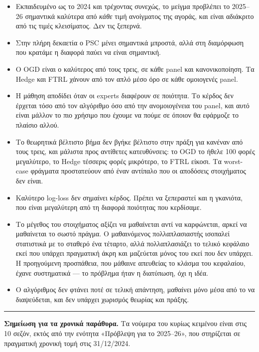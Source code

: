 \documentclass[11pt,a4paper]{article}
\renewcommand{\_}{\oldunderscore\allowbreak}
\begin{document}
\begin{itemize}
  \item Εκπαιδευμένο ως το 2024 και τρέχοντας συνεχώς, το μείγμα προβλέπει το 2025--26
        σημαντικά καλύτερα από \emph{κάθε} τιμή ανοίγματος της αγοράς, και είναι αδιάκριτο
        από τις τιμές κλεισίματος. Δεν τις ξεπερνά.
  \item Στην πλήρη δεκαετία ο PSC μένει σημαντικά μπροστά, αλλά στη διαμόρφωση που κρατάμε
        η διαφορά παύει να είναι σημαντική.
  \item Ο OGD είναι ο καλύτερος από τους τρεις, σε κάθε panel και κανονικοποίηση. Τα Hedge
        και FTRL χάνουν από τον απλό μέσο όρο σε κάθε ομοιογενές panel.
  \item Η μάθηση αποδίδει όταν οι experts διαφέρουν σε ποιότητα. Το κέρδος δεν έρχεται τόσο
        από τον αλγόριθμο όσο από την ανομοιογένεια του panel, και αυτό είναι μάλλον το πιο
        χρήσιμο που έχουμε να πούμε σε όποιον θα εφάρμοζε το πλαίσιο αλλού.
  \item Το θεωρητικά βέλτιστο βήμα δεν βγήκε βέλτιστο στην πράξη για κανέναν από τους τρεις,
        και μάλιστα προς αντίθετες κατευθύνσεις: το OGD το ήθελε 100 φορές μεγαλύτερο, το
        Hedge τέσσερις φορές μικρότερο, το FTRL είκοσι. Τα worst-case φράγματα προστατεύουν
        από έναν αντίπαλο που οι αποδόσεις στοιχήματος δεν είναι.
  \item Καλύτερο log-loss δεν σημαίνει κέρδος. Πρέπει να ξεπεραστεί και η γκανιότα, που
        είναι μεγαλύτερη από τη διαφορά ποιότητας που κερδίσαμε.
  \item Το μέγεθος του στοιχήματος αξίζει να μαθαίνεται αντί να καρφώνεται, αρκεί να
        μαθαίνεται το σωστό πράγμα. Ο μαθαινόμενος πολλαπλασιαστής ισοπαλεί στατιστικά με το
        σταθερό ένα τέταρτο, αλλά πολλαπλασιάζει το τελικό κεφάλαιο εκεί που υπάρχει
        πραγματική άκρη και μαζεύεται μόνος του εκεί που δεν υπάρχει. Η προηγούμενη
        προσπάθεια, που μάθαινε απευθείας το κλάσμα του κεφαλαίου, έχανε συστηματικά ---
        το πρόβλημα ήταν η διατύπωση, όχι η ιδέα.
  \item Ο αλγόριθμος δεν φτάνει ποτέ σε τελική απάντηση, μαθαίνει μόνο μέσα από το να 
       διαψεύδεται, και δεν υπάρχει χωρισμός θεωρίας και πράξης.
\end{itemize}



\vspace{1em}
\hrule
\vspace{0.6em}
{\small
\textbf{Σημείωση για τα χρονικά παράθυρα.} Τα νούμερα του κυρίως κειμένου είναι στις 10
σεζόν, εκτός από την ενότητα «Πρόβλεψη για το 2025--26», που στηρίζεται σε πραγματική
χρονική τομή στις 31/12/2024.
}
\end{document}
